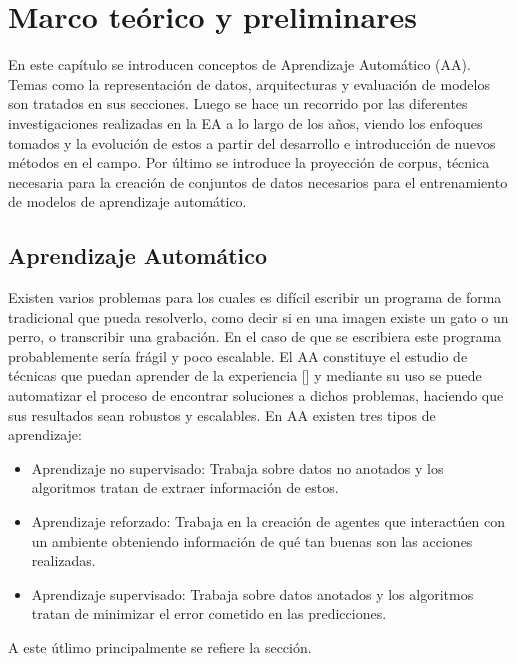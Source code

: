 \chapter{Marco teórico y preliminares}\label{chapter:background}

En este capítulo se introducen conceptos de Aprendizaje Automático (AA). Temas
como la representación de datos, arquitecturas y evaluación de modelos son tratados en sus secciones.
Luego se hace un recorrido por las diferentes investigaciones realizadas en la EA a lo largo de los años, viendo
los enfoques tomados y la evolución de estos a partir del desarrollo e introducción de nuevos métodos en el
campo. Por último se introduce la proyección de corpus, técnica necesaria para la creación de conjuntos 
de datos necesarios para el entrenamiento de modelos de aprendizaje automático.


\section{Aprendizaje Automático}

Existen varios problemas para los cuales es difícil escribir un programa de forma tradicional que pueda
resolverlo, como decir si en una imagen existe un gato o un perro, o transcribir una grabación. En el caso
de que se escribiera este programa probablemente sería frágil y poco escalable. El AA constituye el 
estudio de técnicas que puedan aprender de la experiencia [\cite{d2l}] y mediante su uso 
se puede automatizar el proceso de encontrar soluciones a dichos problemas, haciendo que sus resultados sean 
robustos y escalables. En AA existen tres tipos de aprendizaje:
\begin{itemize}
	\item Aprendizaje no supervisado: Trabaja sobre datos no anotados y los algoritmos tratan de 
	extraer información de estos.
	\item Aprendizaje reforzado: Trabaja en la creación de agentes que interactúen con 
	un ambiente obteniendo información de qué tan buenas son las acciones realizadas.
	\item Aprendizaje supervisado: Trabaja sobre datos anotados y los algoritmos tratan de minimizar
	el error cometido en las predicciones.
\end{itemize}
A este útlimo principalmente se refiere la sección.

